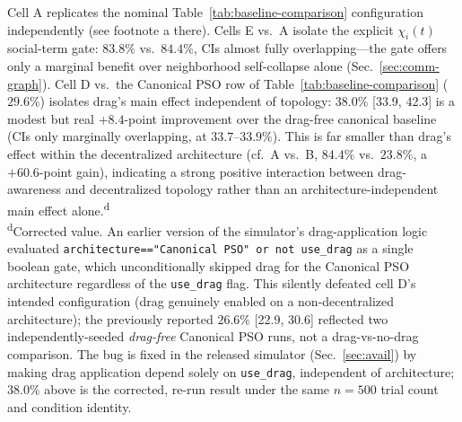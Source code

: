 \documentclass[conference]{IEEEtran}
\begin{document}
\begin{table}[t]
\vspace{2pt}
\raggedright\scriptsize
Cell A replicates the nominal Table~\ref{tab:baseline-comparison} configuration independently (see footnote a there). Cells E vs.\ A isolate the explicit $\chi_i(t)$ social-term gate: $83.8\%$ vs.\ $84.4\%$, CIs almost fully overlapping---the gate offers only a marginal benefit over neighborhood self-collapse alone (Sec.~\ref{sec:comm-graph}). Cell D vs.\ the Canonical PSO row of Table~\ref{tab:baseline-comparison} ($29.6\%$) isolates drag's main effect independent of topology: $38.0\%$ [33.9, 42.3] is a modest but real $+8.4$-point improvement over the drag-free canonical baseline (CIs only marginally overlapping, at $33.7$--$33.9\%$). This is far smaller than drag's effect within the decentralized architecture (cf.\ A vs.\ B, $84.4\%$ vs.\ $23.8\%$, a $+60.6$-point gain), indicating a strong positive interaction between drag-awareness and decentralized topology rather than an architecture-independent main effect alone.\textsuperscript{d}\\[2pt]
\textsuperscript{d}Corrected value. An earlier version of the simulator's drag-application logic evaluated \texttt{architecture=="Canonical PSO" or not use\_drag} as a single boolean gate, which unconditionally skipped drag for the Canonical PSO architecture regardless of the \texttt{use\_drag} flag. This silently defeated cell D's intended configuration (drag genuinely enabled on a non-decentralized architecture); the previously reported $26.6\%$ [22.9, 30.6] reflected two independently-seeded \emph{drag-free} Canonical PSO runs, not a drag-vs-no-drag comparison. The bug is fixed in the released simulator (Sec.~\ref{sec:avail}) by making drag application depend solely on \texttt{use\_drag}, independent of architecture; $38.0\%$ above is the corrected, re-run result under the same $n{=}500$ trial count and condition identity.
\end{table}
\end{document}
